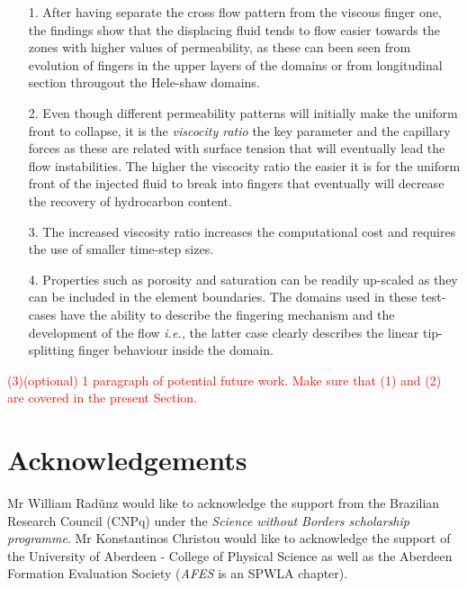 \documentclass[preprint,authoryear,12pt]{elsarticle}
\newcommand{\red}{\textcolor{red}}
\newcommand{\ie}{{\it i.e., }}
\begin{document}
\begin{enumerate}
\item[1.] After having separate the cross flow pattern from the viscous finger one, the findings show that the displacing fluid tends to flow easier towards the zones with higher values of permeability, as these can been seen from evolution of fingers in the upper layers of the domains or from longitudinal section througout the Hele-shaw domains. 
\item[2.] Even though different permeability patterns will initially make the uniform front to collapse, it is the \textit{viscocity ratio} the key parameter and the capillary forces as these are related with surface tension that will eventually lead the flow instabilities. The higher the viscocity ratio the easier it is for the uniform front of the injected fluid to break into fingers that eventually will decrease the recovery of hydrocarbon content.
\item[3.] The increased viscosity ratio increases the computational cost and requires the use of smaller time-step sizes. 
\item[4.] Properties such as porosity and saturation can be readily up-scaled as they can be included in the element boundaries. The domains used in these test-cases have the ability to describe the fingering mechanism and the development of the flow \ie the latter case clearly describes the linear tip-splitting finger behaviour inside the domain.
\end{enumerate}

\red{(3)(optional) 1 paragraph of potential future work. Make sure that (1) and (2) are covered in the present Section.}

\section{Acknowledgements}
Mr William Rad\"unz would like to acknowledge the support from the Brazilian Research Council (CNPq) under the \textit{Science without Borders scholarship programme}. Mr Konstantinos Christou would like to acknowledge the support of the University of Aberdeen - College of Physical Science as well as the Aberdeen Formation Evaluation Society (\textit{AFES} is an SPWLA chapter). 

\clearpage 
 

  
\clearpage 

\listoftables
\clearpage

\clearpage  
\listoffigures
\clearpage


% 
\end{document}
